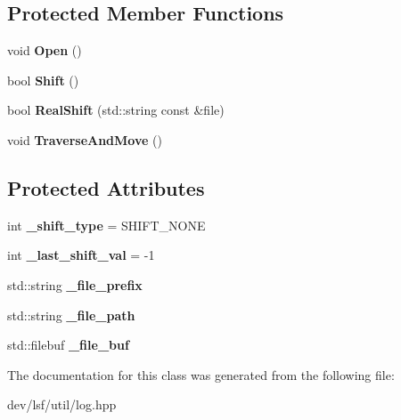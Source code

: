 \subsection*{Protected Member Functions}
\begin{DoxyCompactItemize}
\item 
\hypertarget{classlsf_1_1util_1_1LogFileBuf_afbe8d09c09a4416c4912f424a436a62a}{
void {\bfseries Open} ()}
\label{classlsf_1_1util_1_1LogFileBuf_afbe8d09c09a4416c4912f424a436a62a}

\item 
\hypertarget{classlsf_1_1util_1_1LogFileBuf_a85c0c75cfd8d7738948d78d8fee3912c}{
bool {\bfseries Shift} ()}
\label{classlsf_1_1util_1_1LogFileBuf_a85c0c75cfd8d7738948d78d8fee3912c}

\item 
\hypertarget{classlsf_1_1util_1_1LogFileBuf_a94cc1f99da578c6a66c274f85d11acc7}{
bool {\bfseries RealShift} (std::string const \&file)}
\label{classlsf_1_1util_1_1LogFileBuf_a94cc1f99da578c6a66c274f85d11acc7}

\item 
\hypertarget{classlsf_1_1util_1_1LogFileBuf_a9372b9a1e95c9a7f11871078292114a3}{
void {\bfseries TraverseAndMove} ()}
\label{classlsf_1_1util_1_1LogFileBuf_a9372b9a1e95c9a7f11871078292114a3}

\end{DoxyCompactItemize}
\subsection*{Protected Attributes}
\begin{DoxyCompactItemize}
\item 
\hypertarget{classlsf_1_1util_1_1LogFileBuf_a50597ab6d77356c388ee0266df9105a8}{
int {\bfseries \_\-shift\_\-type} = SHIFT\_\-NONE}
\label{classlsf_1_1util_1_1LogFileBuf_a50597ab6d77356c388ee0266df9105a8}

\item 
\hypertarget{classlsf_1_1util_1_1LogFileBuf_a9d32c18d7b7f3190475171a8c3651cc5}{
int {\bfseries \_\-last\_\-shift\_\-val} = -\/1}
\label{classlsf_1_1util_1_1LogFileBuf_a9d32c18d7b7f3190475171a8c3651cc5}

\item 
\hypertarget{classlsf_1_1util_1_1LogFileBuf_a3e7061fcf5307ef6f5f373f909ed119f}{
std::string {\bfseries \_\-file\_\-prefix}}
\label{classlsf_1_1util_1_1LogFileBuf_a3e7061fcf5307ef6f5f373f909ed119f}

\item 
\hypertarget{classlsf_1_1util_1_1LogFileBuf_a240c7b823b55bcfad6e1b02f41631571}{
std::string {\bfseries \_\-file\_\-path}}
\label{classlsf_1_1util_1_1LogFileBuf_a240c7b823b55bcfad6e1b02f41631571}

\item 
\hypertarget{classlsf_1_1util_1_1LogFileBuf_a35c89c6a1c300ea0b99b19b327d5cc65}{
std::filebuf {\bfseries \_\-file\_\-buf}}
\label{classlsf_1_1util_1_1LogFileBuf_a35c89c6a1c300ea0b99b19b327d5cc65}

\end{DoxyCompactItemize}


The documentation for this class was generated from the following file:\begin{DoxyCompactItemize}
\item 
dev/lsf/util/log.hpp\end{DoxyCompactItemize}
